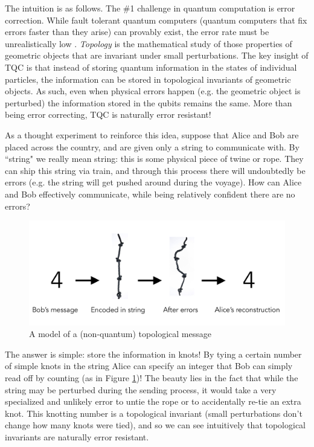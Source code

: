 \documentclass{article}
\theoremstyle{definition}
\numberwithin{figure}{section}
\begin{document}
The intuition is as follows. The $\#$1 challenge in quantum computation is error correction. While fault tolerant quantum computers (quantum computers that fix errors faster than they arise) can provably exist, the error rate must be unrealistically low \cite{gottesman1998theory}. \textit{Topology} is the mathematical study of those properties of geometric objects that are invariant under small perturbations. The key insight of TQC is that instead of storing quantum information in the states of individual particles, the information can be stored in topological invariants of geometric objects. As such, even when physical errors happen (e.g. the geometric object is perturbed) the information stored in the qubits remains the same. More than being error correcting, TQC is naturally error resistant!

As a thought experiment to reinforce this idea, suppose that Alice and Bob are placed across the country, and are given only a string to communicate with. By ``string" we really mean string: this is some physical piece of twine or rope. They can ship this string via train, and through this process there will undoubtedly be errors (e.g. the string will get pushed around during the voyage). How can Alice and Bob effectively communicate, while being relatively confident there are no errors?

\begin{figure}
\begin{center}
\includegraphics[scale=0.25]{rope-deformations}
\caption{A model of a (non-quantum) topological message}
\label{fig:rope-deformations}
\end{center}
\end{figure}

The answer is simple: store the information in knots! By tying a certain number of simple knots in the string Alice can specify an integer that Bob can simply read off by counting (as in Figure \ref{fig:rope-deformations})! The beauty lies in the fact that while the string may be perturbed during the sending process, it would take a very specialized and unlikely error to untie the rope or to accidentally re-tie an extra knot. This knotting number is a topological invariant (small perturbations don't change how many knots were tied), and so we can see intuitively that topological invariants are naturally error resistant.
\end{document}
